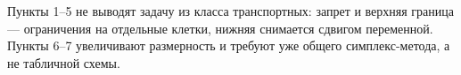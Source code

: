 Пункты 1--5 не выводят задачу из класса транспортных: запрет и верхняя граница
— ограничения на отдельные клетки, нижняя снимается сдвигом переменной.
Пункты 6--7 увеличивают размерность и требуют уже общего симплекс-метода, а не
табличной схемы.

